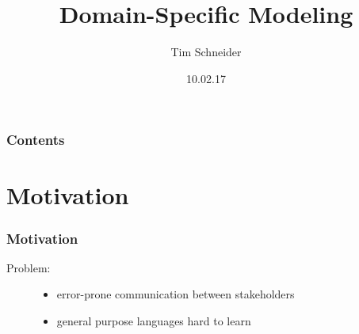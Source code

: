 \documentclass[11 pt,t]{beamer}
\author{Tim Schneider}
\title{Domain-Specific Modeling}
\date{10.02.17}
\begin{document}
\frame{

\titlepage

}
\begin{frame}
\vspace{.5cm}
  \frametitle{Contents}
  \tableofcontents
\end{frame}

\section{Motivation}
\begin{frame}
\frametitle{Motivation}
\begin{description}
  \item[Problem:]
    \begin{itemize}
     \item error-prone communication between stakeholders 
     \item general purpose languages hard to learn
    \end{itemize}
\end{description}


\end{frame}
\end{document}
